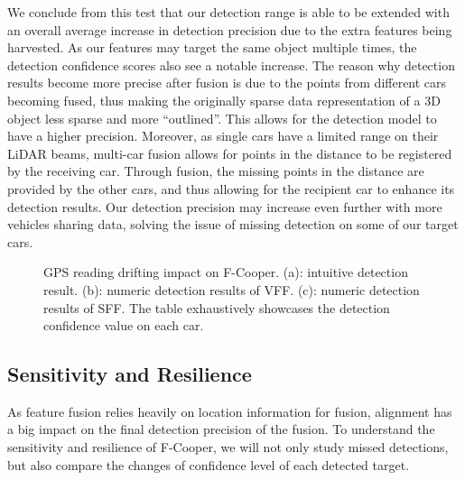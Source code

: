 \documentclass[sigconf]{acmart}
\begin{document}
We conclude from this test that our detection range is able to be extended with an overall average increase in detection precision due to the extra features being harvested. As our features may target the same object multiple times, the detection confidence scores also see a notable increase. 
The reason why detection results become more precise after fusion is due to the
points from different cars becoming fused, thus making the originally sparse data
representation of a 3D object less sparse and more ``outlined''. This allows for the
detection model to have a higher precision.
Moreover, as single cars have a limited range on their LiDAR beams, multi-car fusion
allows for points in the distance to be registered by the receiving car. Through fusion,
the missing points in the distance are provided by the other cars, and thus allowing for
the recipient car to enhance its detection results.
Our detection precision may increase even further with more vehicles sharing data, solving the issue of missing detection on some of our target cars.

\begin{figure*}[!h]
\centering
\vspace{-11pt}
\vfill
\caption{GPS reading drifting impact on F-Cooper. (a): intuitive detection result. (b): numeric detection results of VFF. (c): numeric detection results of SFF. The table exhaustively showcases the detection confidence value on each car.}
\vspace{-5pt}
\label{figure:GPS_det}
\end{figure*}


\subsection{\textbf{Sensitivity and Resilience}}

As feature fusion relies heavily on location information for fusion, alignment has a big impact on the final detection precision of the fusion. 
To understand the sensitivity and resilience of F-Cooper, we will not only study missed detections, but also compare the changes of confidence level of each detected target. 
\end{document}
